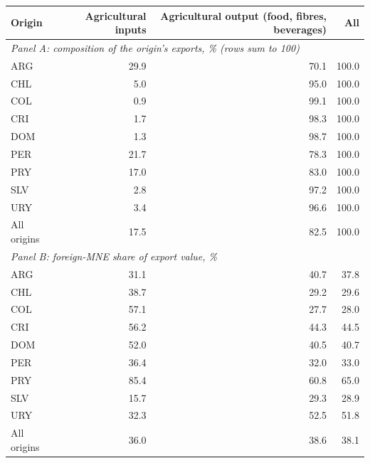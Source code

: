 \begin{tabular}{lrrr}
\toprule
Origin & Agricultural inputs & Agricultural output (food, fibres, beverages) & All \\
\midrule
\multicolumn{4}{l}{\textit{Panel A: composition of the origin's exports, \% (rows sum to 100)}} \\
ARG & 29.9 & 70.1 & 100.0 \\
CHL & 5.0 & 95.0 & 100.0 \\
COL & 0.9 & 99.1 & 100.0 \\
CRI & 1.7 & 98.3 & 100.0 \\
DOM & 1.3 & 98.7 & 100.0 \\
PER & 21.7 & 78.3 & 100.0 \\
PRY & 17.0 & 83.0 & 100.0 \\
SLV & 2.8 & 97.2 & 100.0 \\
URY & 3.4 & 96.6 & 100.0 \\
All origins & 17.5 & 82.5 & 100.0 \\
\midrule
\multicolumn{4}{l}{\textit{Panel B: foreign-MNE share of export value, \%}} \\
ARG & 31.1 & 40.7 & 37.8 \\
CHL & 38.7 & 29.2 & 29.6 \\
COL & 57.1 & 27.7 & 28.0 \\
CRI & 56.2 & 44.3 & 44.5 \\
DOM & 52.0 & 40.5 & 40.7 \\
PER & 36.4 & 32.0 & 33.0 \\
PRY & 85.4 & 60.8 & 65.0 \\
SLV & 15.7 & 29.3 & 28.9 \\
URY & 32.3 & 52.5 & 51.8 \\
All origins & 36.0 & 38.6 & 38.1 \\
\bottomrule
\end{tabular}
